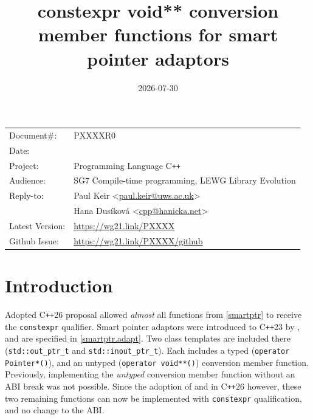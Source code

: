 \documentclass[10pt]{article}
\date{}
\title{constexpr void** conversion member functions for smart pointer adaptors}
\makeatletter
\newcommand*{\wgxxi}[1]{[\href{https://wg21.link/#1}{#1}]}
\newcommand*{\Cpp}{C\texttt{++}}
\newcommand{\emailaddressP}{paul.keir@uws.ac.uk}
\newcommand{\emailaddressH}{cpp@hanicka.net}
\newcommand{\emailP}{\href{mailto:\emailaddressP}{\emailaddressP}}
\newcommand{\emailH}{\href{mailto:\emailaddressH}{\emailaddressH}}
\makeatother
\begin{document}

\maketitle\vspace{-2cm}

\begin{flushright}
  \begin{tabular}{ll}
  Document\#:     &PXXXXR0\\
  Date:           &\date{2026-07-30}\\
  Project:        &Programming Language \Cpp{}\\
  Audience:       &SG7 Compile-time programming, LEWG Library Evolution\\
  Reply-to:       &Paul Keir \textless\emailP\textgreater\\
                  &Hana Dusíková \textless\emailH\textgreater\\
  Latest Version: &\url{https://wg21.link/PXXXX}\\
  Github Issue:   &\url{https://wg21.link/PXXXX/github}
  \end{tabular}
\end{flushright}

{\hypersetup{linkcolor=black}
  \tableofcontents
}




\section{Introduction}

Adopted \Cpp{}26 proposal \cite{P3037R6} allowed \emph{almost} all functions
from \wgxxi{smartptr} to receive the \texttt{constexpr} qualifier. Smart
pointer adaptors were introduced to \Cpp{}23 by \cite{P1132R8}, and are
specified in \wgxxi{smartptr.adapt}. Two class templates are included there
(\texttt{std::out\_ptr\_t} and \texttt{std::inout\_ptr\_t}). Each includes a
typed (\texttt{operator Pointer*()}), and an untyped (\texttt{operator
void**()}) conversion member function. Previously, implementing the
\emph{untyped} conversion member function without an ABI break was not
possible. Since the adoption of \cite{P2738R1} and \cite{P2641R4} in \Cpp{}26
however, these two remaining functions can now be implemented with
\texttt{constexpr} qualification, and no change to the ABI.
\end{document}
